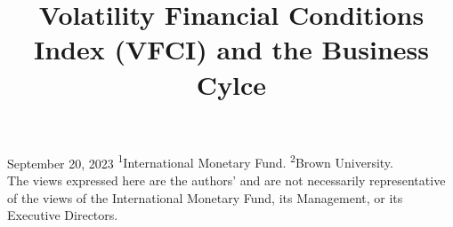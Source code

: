 \documentclass[12pt,xcolor={dvipsnames},hyperref={pdftex,pdfpagemode=UseNone,hidelinks,pdfdisplaydoctitle=true},usepdftitle=false]{beamer}
\begin{document}
\title{Volatility Financial Conditions Index (VFCI) and the Business Cylce}
{September 20, 2023}
{}
{\textsuperscript{1}International Monetary Fund. \textsuperscript{2}Brown University.\\\vspace{0.2cm}The views expressed here are the authors’ and are not necessarily representative of the views of the International Monetary Fund, its Management, or its Executive Directors.}

\frame[plain]{\titlepage}











\appendix


\end{document}
